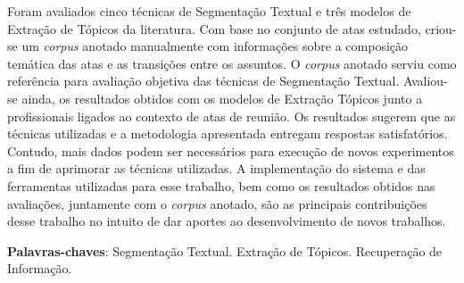 \begin{resumo}
% 
% 
% 
% 
Foram avaliados cinco técnicas de Segmentação Textual e três modelos de Extração de Tópicos da literatura. Com base no conjunto de atas estudado, criou-se um \textit{corpus} anotado manualmente com informações sobre a composição temática das atas e as transições entre os assuntos. O \textit{corpus} anotado serviu como referência para avaliação objetiva das técnicas de Segmentação Textual. Avaliou-se ainda, os resultados obtidos com os modelos de Extração Tópicos junto a profissionais ligados ao contexto de atas de reunião.
% 
% 
% 
% 
Os resultados sugerem que as técnicas utilizadas e a metodologia apresentada entregam respostas satisfatórios. Contudo, mais dados podem ser necessários para execução de novos experimentos a fim de aprimorar as técnicas utilizadas.
% 
% 
% 
% 
% 
A implementação do sistema e das ferramentas utilizadas para esse trabalho, bem como os resultados obtidos nas avaliações, juntamente com o \textit{corpus} anotado, são as principais contribuições desse trabalho no intuito de dar aportes ao desenvolvimento de novos trabalhos.
% 
% 
% 
% 
% 


\textbf{Palavras-chaves}: 
Segmentação Textual. 
Extração de Tópicos.
Recuperação de Informação. 

\end{resumo}


